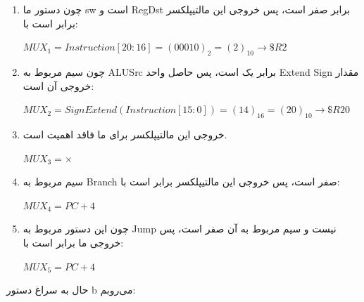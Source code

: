 \setRTL

\begin{enumerate}
	\item 
	چون دستور ما sw است و RegDst برابر صفر است، پس خروجی این مالتیپلکسر برابر است با:
	\setLTR
	
	$MUX_1 = Instruction[20:16]=(00010)_2 = (2)_{10} \rightarrow \$R2$
	
	\setRTL
	
	\item 
	چون سیم مربوط به ALUSrc برابر یک است، پس حاصل واحد Extend Sign مقدار خروجی آن است:
	\setLTR
	
	$MUX_2 = SignExtend(Instruction[15:0])= (14)_{16} = (20)_{10} \rightarrow \$R20$
	
	\setRTL
	
	\item 
	خروجی این مالتیپلکسر برای ما فاقد اهمیت است.
	
	\setLTR
	
	$MUX_3 = \times$
	
	\setRTL
	
	\item 
	سیم مربوط به Branch صفر است، پس خروجی این مالتیپلکسر برابر است با:
	\setLTR
	
	$MUX_4 = PC +4$
	
	\setRTL
	
	\item 
	چون این دستور مربوط به Jump نیست و سیم مربوط به آن صفر است، پس خروجی ما برابر است با:
	\setLTR
	
	$MUX_5 = PC +4$
	
	\setRTL
\end{enumerate}

حال به سراغ دستور b می‌روبم:

